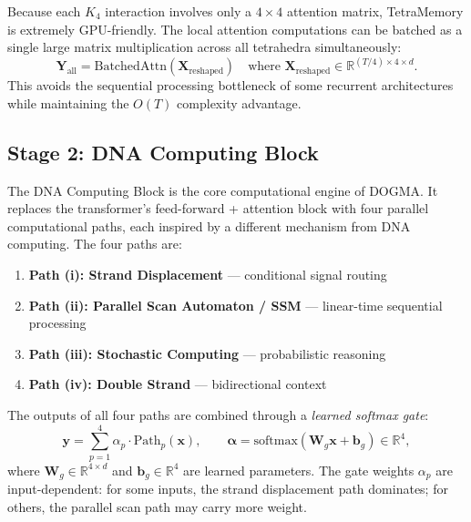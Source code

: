 \begin{implnote}
Because each $K_4$ interaction involves only a $4 \times 4$ attention matrix, TetraMemory is extremely GPU-friendly. The local attention computations can be batched as a single large matrix multiplication across all tetrahedra simultaneously:
\begin{equation}
\mathbf{Y}_{\text{all}} = \mathrm{BatchedAttn}(\mathbf{X}_{\text{reshaped}}) \quad \text{where } \mathbf{X}_{\text{reshaped}} \in \mathbb{R}^{(T/4) \times 4 \times d}.
\end{equation}
This avoids the sequential processing bottleneck of some recurrent architectures while maintaining the $O(T)$ complexity advantage.
\end{implnote}

\subsection{Stage 2: DNA Computing Block}
\label{sec:stage-dna-block}

The DNA Computing Block is the core computational engine of DOGMA. It replaces the transformer's feed-forward + attention block with four parallel computational paths, each inspired by a different mechanism from DNA computing. The four paths are:
\begin{enumerate}[leftmargin=1.5em]
\item \textbf{Path (i): Strand Displacement} --- conditional signal routing
\item \textbf{Path (ii): Parallel Scan Automaton / SSM} --- linear-time sequential processing
\item \textbf{Path (iii): Stochastic Computing} --- probabilistic reasoning
\item \textbf{Path (iv): Double Strand} --- bidirectional context
\end{enumerate}

The outputs of all four paths are combined through a \emph{learned softmax gate}:
\begin{equation}
\mathbf{y} = \sum_{p=1}^{4} \alpha_p \cdot \mathrm{Path}_p(\mathbf{x}), \qquad \boldsymbol{\alpha} = \mathrm{softmax}(\mathbf{W}_g \mathbf{x} + \mathbf{b}_g) \in \mathbb{R}^4,
\label{eq:gated-fusion}
\end{equation}
where $\mathbf{W}_g \in \mathbb{R}^{4 \times d}$ and $\mathbf{b}_g \in \mathbb{R}^4$ are learned parameters. The gate weights $\alpha_p$ are input-dependent: for some inputs, the strand displacement path dominates; for others, the parallel scan path may carry more weight.

